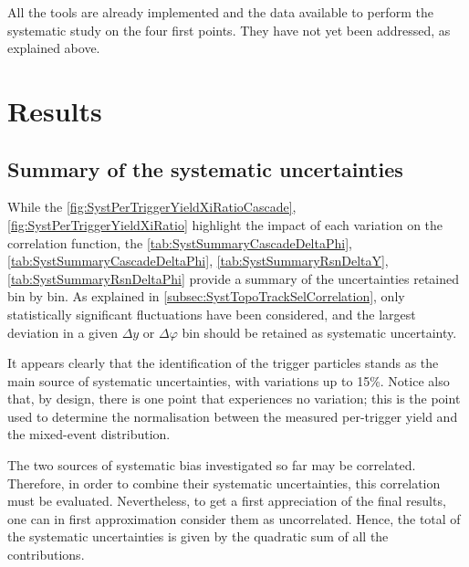 All the tools are already implemented and the data available to perform the systematic study on the four first points. They have not yet been addressed, as explained above. 


\section{Results}

\subsection{Summary of the systematic uncertainties}

While the \figs\ref{fig:SystPerTriggerYieldXiRatioCascade}, \ref{fig:SystPerTriggerYieldXiRatio} highlight the impact of each variation on the correlation function, the \tabs\ref{tab:SystSummaryCascadeDeltaPhi}, \ref{tab:SystSummaryCascadeDeltaPhi}, \ref{tab:SystSummaryRsnDeltaY}, \ref{tab:SystSummaryRsnDeltaPhi} provide a summary of the uncertainties retained bin by bin. As explained in \Sec\ref{subsec:SystTopoTrackSelCorrelation}, only statistically significant fluctuations have been considered, and the largest deviation in a given $\Delta y$ or $\Delta \varphi$ bin should be retained as systematic uncertainty.

It appears clearly that the identification of the trigger particles stands as the main source of systematic uncertainties, with variations up to 15\%. Notice also that, by design, there is one point that experiences no variation; this is the point used to determine the normalisation between the measured per-trigger yield and the mixed-event distribution.

The two sources of systematic bias investigated so far may be correlated. Therefore, in order to combine their systematic uncertainties, this correlation must be evaluated. Nevertheless, to get a first appreciation of the final results, one can in first approximation consider them as uncorrelated. Hence, the total of the systematic uncertainties is given by the quadratic sum of all the contributions.


